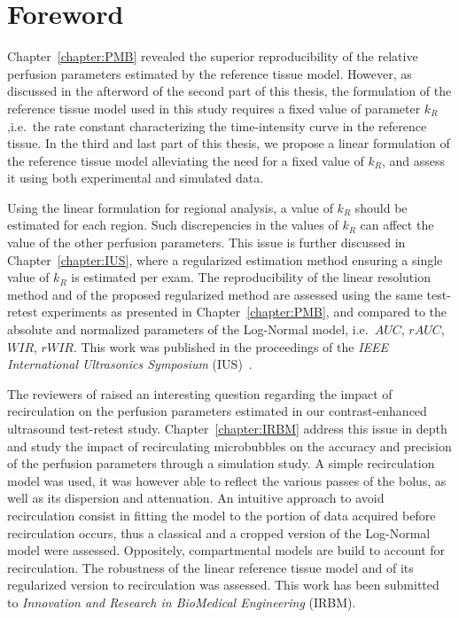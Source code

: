 \chapter*{Foreword}
Chapter~\ref{chapter:PMB} revealed the superior reproducibility of the relative perfusion parameters estimated by the reference tissue model.
However, as discussed in the afterword of the second part of this thesis, the formulation of the reference tissue model used in this study requires a fixed value of parameter $k_R$,i.e.~the rate constant characterizing the time-intensity curve in the reference tissue.
In the third and last part of this thesis, we propose a linear formulation of the reference tissue model alleviating the need for a fixed value of $k_R$, and assess it using both experimental and simulated data.

Using the linear formulation for regional analysis, a value of $k_R$ should be estimated for each region.
Such discrepencies in the values of $k_R$ can affect the value of the other perfusion parameters.
This issue is further discussed in Chapter~\ref{chapter:IUS}, where a regularized estimation method ensuring a single value of $k_R$ is estimated per exam.
The reproducibility of the linear resolution method and of the proposed regularized method are assessed using the same test-retest experiments as presented in Chapter~\ref{chapter:PMB}, and compared to the absolute and normalized parameters of the Log-Normal model, i.e.~$AUC$, $rAUC$, $WIR$, $rWIR$.
This work was published in the proceedings of the {\em IEEE International Ultrasonics Symposium} (IUS)~\cite{Doury:2016fi}.

The reviewers of \cite{Doury:2016fi} raised an interesting question regarding the impact of recirculation on the perfusion parameters estimated in our contrast-enhanced ultrasound test-retest study.
Chapter~\ref{chapter:IRBM} address this issue in depth and study the impact of recirculating microbubbles on the accuracy and precision of the perfusion parameters through a simulation study.
A simple recirculation model was used, it was however able to reflect the various passes of the bolus, as well as its dispersion and attenuation.
An intuitive approach to avoid recirculation consist in fitting the model to the portion of data acquired before recirculation occurs, thus a classical and a cropped version of the Log-Normal model were assessed.
Oppositely, compartmental models are build to account for recirculation.
The robustness of the linear reference tissue model and of its regularized version to recirculation was assessed.
This work has been submitted to {\em Innovation and Research in BioMedical Engineering} (IRBM).

